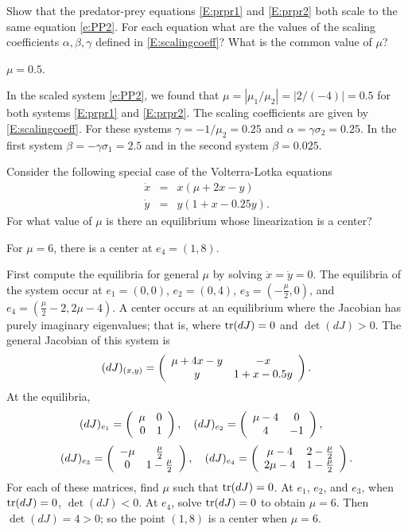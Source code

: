 \documentclass{ximera}
\begin{document}
\begin{exercise} \label{c9.1.6}
Show that the predator-prey equations \eqref{E:prpr1} and \eqref{E:prpr2} both 
scale to the same equation \eqref{e:PP2}.  For each equation what are the 
values of the scaling coefficients $\alpha,\beta,\gamma$ defined in 
\eqref{E:scalingcoeff}?  What is the common value of $\mu$?

\begin{solution}
\ans  $\mu = 0.5$.

\soln  In the scaled system \eqref{e:PP2}, we found that
$\mu=|\mu_1/\mu_2|= |2/(-4)|=0.5$ for both systems \eqref{E:prpr1} and 
\eqref{E:prpr2}.  The scaling coefficients are given by \eqref{E:scalingcoeff}. 
For these systems $\gamma=-1/\mu_2=0.25$ and
$\alpha=\gamma\sigma_2=0.25$.  In the first system
$\beta=-\gamma\sigma_1= 2.5$ and in the second system $\beta=0.025$.

\end{solution}
\end{exercise}



\begin{exercise} \label{c9.1.2}
Consider the following special case of the Volterra-Lotka equations 
\begin{eqnarray*}
\dot{x} & = & x(\mu + 2x -     y)  \\
\dot{y} & = & y(  1 +  x - 0.25y).
\end{eqnarray*}
For what value of $\mu$ is there an equilibrium whose linearization is a 
center?   

\begin{solution}

\ans For $\mu = 6$, there is a center at $e_4 = (1,8)$.

\soln First compute the equilibria for general $\mu$ by solving
$\dot{x} = \dot{y} = 0$.  The equilibria of the system occur at
$e_1 = (0,0)$, $e_2 = (0,4)$, $e_3 = (-\frac{\mu}{2},0)$, and
$e_4 = (\frac{\mu}{2} - 2, 2\mu - 4)$.  A center occurs at an equilibrium
where the Jacobian has purely imaginary eigenvalues; that is, where
${\rm tr}{(dJ)} = 0$ and $\det{(dJ)} > 0$.  The general Jacobian of this
system is
\[
(dJ)_{(x,y)} = \left(\begin{array}{cc} \mu + 4x - y & -x\\ y &1 + x - 0.5y\end{array}\right).
\]
At the equilibria,
\[
(dJ)_{e_1} = \left(\begin{array}{rr} \mu & 0\\ 0 &1\end{array}\right), \quad
(dJ)_{e_2} = \left(\begin{array}{cc} \mu - 4 & 0\\ 4 &-1\end{array}\right), \quad
\]
\[
(dJ)_{e_3} = \left(\begin{array}{cc} -\mu & \frac{\mu}{2}\\ 0 &1 - \frac{\mu}{2}\end{array}\right), \quad
(dJ)_{e_4} = \left(\begin{array}{cc} \mu - 4 & 2 - \frac{\mu}{2}\\ 2\mu - 4 &1 -
\frac{\mu}{2}\end{array}\right).
\]
For each of these matrices, find $\mu$ such that ${\rm tr}{(dJ)} = 0$.  At
$e_1$, $e_2$, and $e_3$, when ${\rm tr}{(dJ)} = 0$, $\det{(dJ)} < 0$.
At $e_4$, solve ${\rm tr}(dJ) = 0$ to obtain $\mu = 6$.  Then $\det{(dJ)}
= 4 > 0$; so the point $(1,8)$ is a center when $\mu = 6$.

\end{solution}
\end{exercise}
\end{document}
